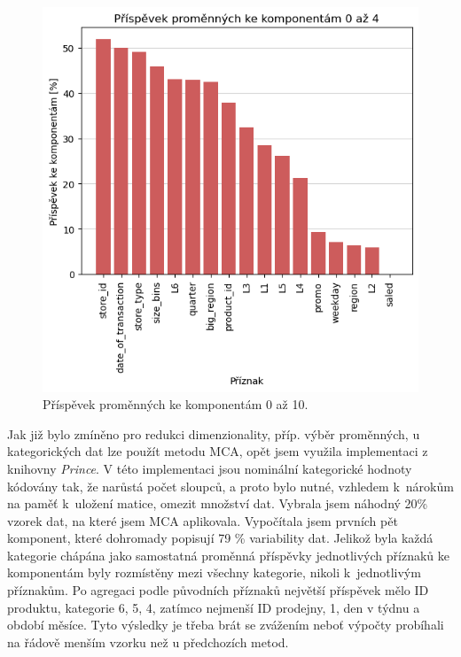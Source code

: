 \begin{figure}[h!]
    \centering
    \includegraphics[width=.8\textwidth]{obrazky/pripravadat/pca-prispevky.png}
    \caption{Příspěvek proměnných ke komponentám 0 až 10.}
    \label{obr:nb:pca_prispevek}
\end{figure}
    
Jak již bylo zmíněno pro redukci dimenzionality, příp. výběr proměnných, u kategorických dat lze použít metodu MCA, opět jsem využila implementaci z knihovny \emph{Prince}. V této implementaci jsou nominální kategorické hodnoty kódovány tak, že narůstá počet sloupců, a proto bylo nutné, vzhledem k~nárokům na paměť k~uložení matice, omezit množství dat. Vybrala jsem náhodný 20\% vzorek dat, na které jsem MCA aplikovala. Vypočítala jsem prvních pět komponent, které dohromady popisují 79 \% variability dat. Jelikož byla každá kategorie chápána jako samostatná proměnná příspěvky jednotlivých příznaků ke komponentám byly rozmístěny mezi všechny kategorie, nikoli k~jednotlivým příznakům. 
Po agregaci podle původních příznaků největší příspěvek mělo ID produktu, kategorie 6, 5, 4, zatímco nejmenší ID prodejny, 1, den v týdnu a období měsíce. Tyto výsledky je třeba brát se zvážením neboť výpočty probíhali na řádově menším vzorku než u předchozích metod.


